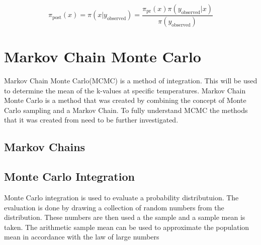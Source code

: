	\begin{equation}
	\label{bayes_eq}
	\pi_{\text{post}}(x) = \pi(x|y_{\text{observed}}) = \frac{\pi_{\text{pr}}(x) \pi(y_{\text{observed}}|x)}{\pi (y_{\text{observed}})}	
	\end{equation}

\section{Markov Chain Monte Carlo}
Markov Chain Monte Carlo(MCMC) is a method of integration. This will be used to determine the mean of the k-values at specific temperatures. 
	Markov Chain Monte Carlo is a method that was created by combining the concept of Monte Carlo sampling  and a Markov Chain. 
	To fully understand MCMC the methods that it was created from need to be further investigated.
	\subsection{Markov Chains}
		
		
		
	\subsection{Monte Carlo Integration}
	Monte Carlo integration is used to evaluate a probability distributuion. 
	The evaluation is done by drawing a collection of random numbers from the distribution.
	These numbers are then used a the sample and a sample mean is taken.
	The arithmetic sample mean can be used to approximate the population mean in accordance with the law of large numbers \citep{Gilks:1996} 
